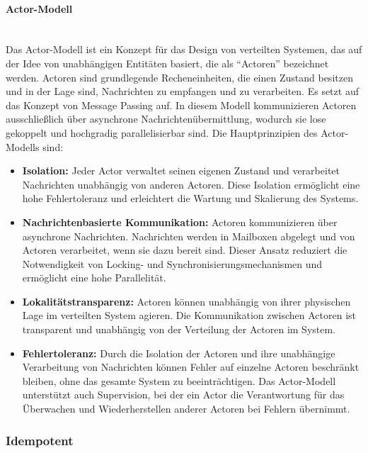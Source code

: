 \documentclass[../vs-script-first-v01.tex]{subfiles}
\begin{document}
\paragraph{Actor-Modell}\mbox{}\\
Das Actor-Modell ist ein Konzept für das Design von verteilten Systemen, das auf der Idee von unabhängigen Entitäten basiert, die als \enquote{Actoren} bezeichnet werden. Actoren sind grundlegende Recheneinheiten, die einen Zustand besitzen und in der Lage sind, Nachrichten zu empfangen und zu verarbeiten. Es setzt auf das Konzept von Message Passing auf. In diesem Modell kommunizieren Actoren ausschließlich über asynchrone Nachrichtenübermittlung, wodurch sie lose gekoppelt und hochgradig parallelisierbar sind. Die Hauptprinzipien des Actor-Modells sind:
\begin{itemize}
\item \textbf{Isolation:} Jeder Actor verwaltet seinen eigenen Zustand und verarbeitet Nachrichten unabhängig von anderen Actoren. Diese Isolation ermöglicht eine hohe Fehlertoleranz und erleichtert die Wartung und Skalierung des Systems.

\item \textbf{Nachrichtenbasierte Kommunikation:} Actoren kommunizieren über asynchrone Nachrichten. Nachrichten werden in Mailboxen abgelegt und von Actoren verarbeitet, wenn sie dazu bereit sind. Dieser Ansatz reduziert die Notwendigkeit von Locking- und Synchronisierungsmechanismen und ermöglicht eine hohe Parallelität.

\item \textbf{Lokalitätstransparenz:} Actoren können unabhängig von ihrer physischen Lage im verteilten System agieren. Die Kommunikation zwischen Actoren ist transparent und unabhängig von der Verteilung der Actoren im System.

\item \textbf{Fehlertoleranz:} Durch die Isolation der Actoren und ihre unabhängige Verarbeitung von Nachrichten können Fehler auf einzelne Actoren beschränkt bleiben, ohne das gesamte System zu beeinträchtigen. Das Actor-Modell unterstützt auch Supervision, bei der ein Actor die Verantwortung für das Überwachen und Wiederherstellen anderer Actoren bei Fehlern übernimmt.
\end{itemize}


\subsubsection{Idempotent}
\end{document}
